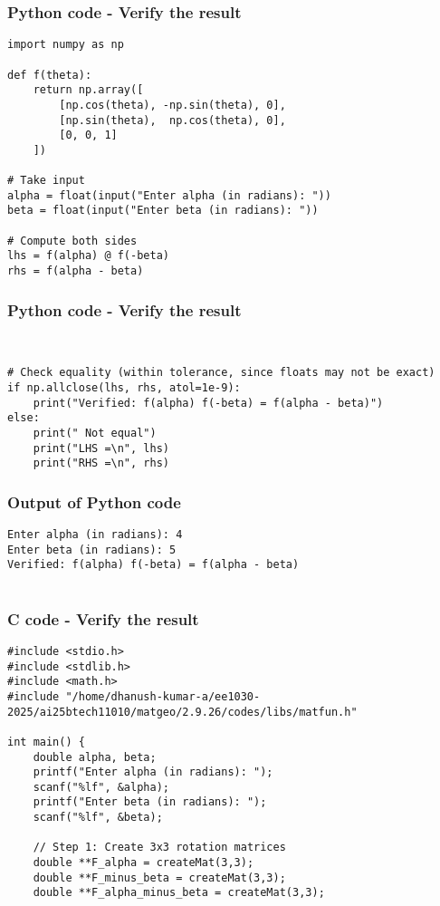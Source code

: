 \documentclass{beamer}
\begin{document}
\begin{frame}[fragile]                            
\frametitle{Python code - Verify the result}                
\begin{lstlisting}
import numpy as np

def f(theta):
    return np.array([
        [np.cos(theta), -np.sin(theta), 0],
        [np.sin(theta),  np.cos(theta), 0],
        [0, 0, 1]
    ])

# Take input
alpha = float(input("Enter alpha (in radians): "))
beta = float(input("Enter beta (in radians): "))

# Compute both sides
lhs = f(alpha) @ f(-beta)
rhs = f(alpha - beta)
\end{lstlisting}
\end{frame}

\begin{frame}[fragile]    \frametitle{Python code - Verify the result}                
\begin{lstlisting}

   
# Check equality (within tolerance, since floats may not be exact)
if np.allclose(lhs, rhs, atol=1e-9):
    print("Verified: f(alpha) f(-beta) = f(alpha - beta)")
else:
    print(" Not equal")
    print("LHS =\n", lhs)
    print("RHS =\n", rhs)
\end{lstlisting}
\end{frame}

\begin{frame}[fragile]                            
\frametitle{Output of Python code}                
\begin{lstlisting}
Enter alpha (in radians): 4
Enter beta (in radians): 5
Verified: f(alpha) f(-beta) = f(alpha - beta)


\end{lstlisting}
\end{frame}

\begin{frame}[fragile]                            
\frametitle{C code - Verify the result}                
\begin{lstlisting}
#include <stdio.h>
#include <stdlib.h>
#include <math.h>
#include "/home/dhanush-kumar-a/ee1030-2025/ai25btech11010/matgeo/2.9.26/codes/libs/matfun.h"

int main() {
    double alpha, beta;
    printf("Enter alpha (in radians): ");
    scanf("%lf", &alpha);
    printf("Enter beta (in radians): ");
    scanf("%lf", &beta);

    // Step 1: Create 3x3 rotation matrices
    double **F_alpha = createMat(3,3);
    double **F_minus_beta = createMat(3,3);
    double **F_alpha_minus_beta = createMat(3,3);
\end{lstlisting}
\end{frame}
\end{document}
